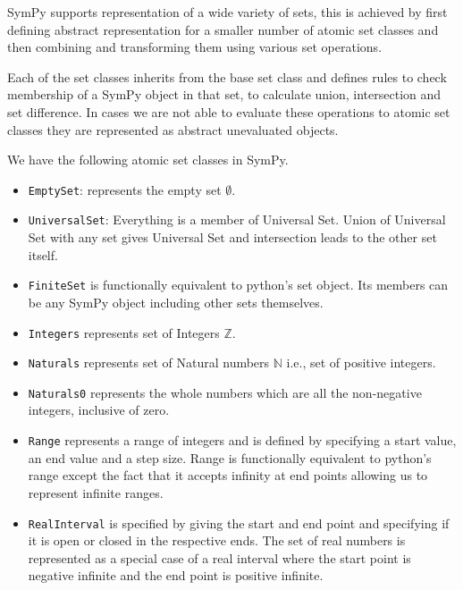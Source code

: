 
SymPy supports representation of a wide variety of sets, this is achieved by
first defining abstract representation for a smaller number of atomic set
classes and then combining and transforming them using various set operations.

Each of the set classes inherits from the base set class and defines rules to
check membership of a SymPy object in that set, to calculate union,
intersection and set difference. In cases we are not able to evaluate these
operations to atomic set classes they are represented as abstract unevaluated
objects.


We have the following atomic set classes in SymPy.

\begin{itemize}

    \item \verb|EmptySet|: represents the empty set $\emptyset$.

    \item \verb|UniversalSet|: Everything is a member of Universal Set.
        Union of Universal Set with any set gives Universal Set and
        intersection leads to the other set itself.

    \item \verb|FiniteSet| is functionally equivalent to python's set
        object. Its members can be any SymPy object including other sets
        themselves.

    \item \verb|Integers| represents set of Integers $\mathbb{Z}$.

    \item \verb|Naturals| represents set of Natural numbers $\mathbb{N}$ i.e.,
        set of positive integers.

    \item \verb|Naturals0| represents the whole numbers which are all the
        non-negative integers, inclusive of zero.

    \item \verb|Range| represents a range of integers and is defined by
        specifying a start value, an end value and a step size. Range is
        functionally equivalent to python's range except the fact that it
        accepts infinity at end points allowing us to represent infinite
        ranges.


    \item \verb|RealInterval| is specified by giving the start and end point
        and specifying if it is open or closed in the respective ends. The set
        of real numbers is represented as a special case of a real interval
        where the start point is negative infinite and the end point is
        positive infinite.


\end{itemize}


